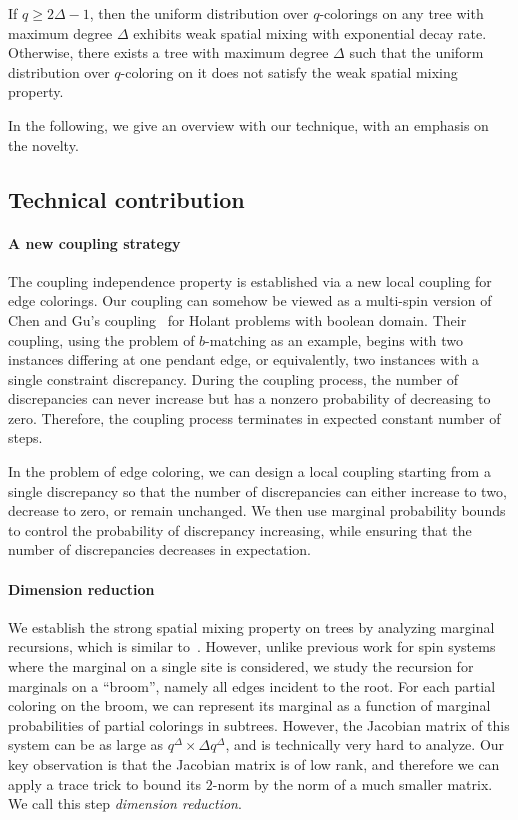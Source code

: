 \begin{theorem}[Informal]\label{thm:WSM-informal}
    If $q\geq 2\Delta-1$, then the uniform distribution over $q$-colorings on any tree with maximum degree $\Delta$ exhibits weak spatial mixing with exponential decay rate. Otherwise, there exists a tree with maximum degree $\Delta$ such that the uniform distribution over $q$-coloring on it does not satisfy the weak spatial mixing property.
\end{theorem}
In the following, we give an overview with our technique, with an emphasis on the novelty.

\subsection{Technical contribution}

\paragraph{A new coupling strategy}

The coupling independence property is established via a new local coupling for edge colorings. Our coupling can somehow be viewed as a multi-spin version of Chen and Gu's coupling~\cite{CG24} for Holant problems with boolean domain. Their coupling, using the problem of $b$-matching as an example, begins with two instances differing at one pendant edge, or equivalently, two instances with a single constraint discrepancy. During the coupling process, the number of discrepancies can never increase but has a nonzero probability of decreasing to zero. Therefore, the coupling process terminates in expected constant number of steps. 

In the problem of edge coloring, we can design a local coupling starting from a single discrepancy so that the number of discrepancies can either increase to two, decrease to zero, or remain unchanged. We then use marginal probability bounds to control the probability of discrepancy increasing, while ensuring that the number of discrepancies decreases in expectation. 

\paragraph{Dimension reduction}

We establish the strong spatial mixing property on trees by analyzing marginal recursions, which is similar to~\cite{CLMM23}. However, unlike previous work for spin systems where the marginal on a single site is considered, we study the recursion for marginals on a ``broom'', namely all edges incident to the root. For each partial coloring on the broom, we can represent its marginal as a function of marginal probabilities of partial colorings in subtrees. However, the Jacobian matrix of this system can be as large as $q^\Delta \times \Delta q^\Delta$, and is technically very hard to analyze. Our key observation is that the Jacobian matrix is of low rank, and therefore we can apply a trace trick to bound its $2$-norm by the norm of a much smaller matrix. We call this step \emph{dimension reduction}.

